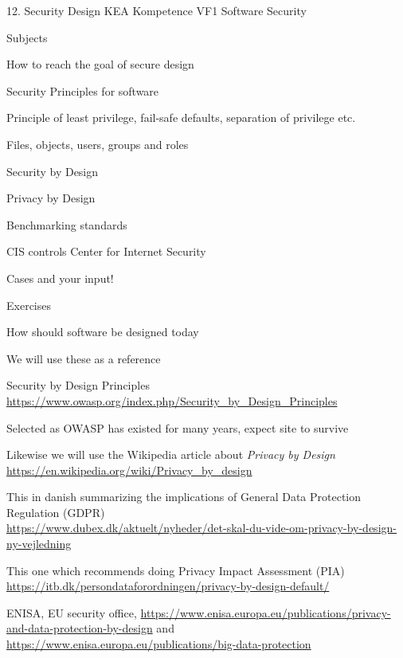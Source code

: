 \documentclass[Screen16to9,17pt]{foils}
\begin{document}
\mytitlepage
{12. Security Design}
{KEA Kompetence VF1 Software Security}


\begin{list1}
\item Subjects
\begin{list2}
\item How to reach the goal of secure design
\item Security Principles for software
\item Principle of least privilege, fail-safe defaults, separation of privilege etc.
\item Files, objects, users, groups and roles
\item Security by Design
\item Privacy by Design
\item Benchmarking standards
\item CIS controls Center for Internet Security
\item Cases and your input!
\end{list2}
\item Exercises
\begin{list2}
\item How should software be designed today
\end{list2}
\end{list1}


\begin{list1}
\item We will use these as a reference
\item Security by Design Principles\\
\url{https://www.owasp.org/index.php/Security_by_Design_Principles}
\item Selected as OWASP has existed for many years, expect site to survive

\item Likewise we will use the Wikipedia article about \emph{Privacy by Design}\\
\url{https://en.wikipedia.org/wiki/Privacy_by_design}
\end{list1}



\begin{list2}
\item This in danish summarizing the implications of General Data Protection Regulation (GDPR)\\
{\footnotesize\url{https://www.dubex.dk/aktuelt/nyheder/det-skal-du-vide-om-privacy-by-design-ny-vejledning}}
\item This one which recommends doing Privacy Impact Assessment (PIA)\\
{\footnotesize\url{https://itb.dk/persondataforordningen/privacy-by-design-default/}}
\item ENISA, EU security office, {\footnotesize\url{https://www.enisa.europa.eu/publications/privacy-and-data-protection-by-design}} and {\footnotesize\url{https://www.enisa.europa.eu/publications/big-data-protection}}
\end{list2}
\end{document}
